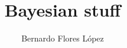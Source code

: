 \author{Bernardo Flores López}  	%

\address{bernardofl@utexas.edu}  %

\title{Bayesian stuff} %


%
%
%
%
%
%


%
%
%
%
%
%


